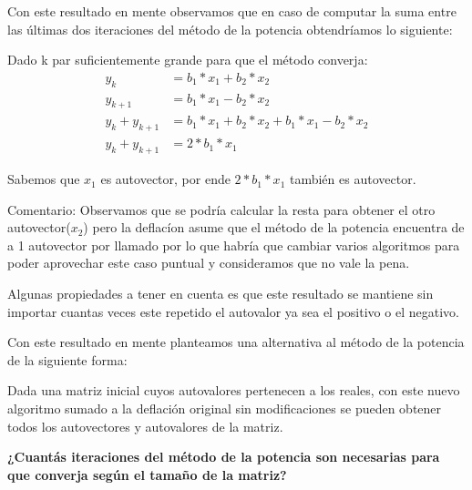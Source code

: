 Con este resultado en mente observamos que en caso de computar la suma entre las últimas dos iteraciones del método de la potencia obtendríamos lo siguiente:

\vspace{1em}
Dado k par suficientemente grande para que el método converja: 
\begin{align}
    y_k &= b_1 * x_1 + b_2 * x_2 \\ 
    y_{k+1} &= b_1 * x_1 - b_2 * x_2 \\ 
    y_k + y_{k+1} &= b_1 * x_1 + b_2 * x_2 + b_1 * x_1 - b_2 * x_2 \\ 
    y_k + y_{k+1} &= 2 * b_1 * x_1
\end{align}

Sabemos que $x_1$ es autovector, por ende $2 * b_1 * x_1$ también es autovector.

\vspace{1em}

Comentario: Observamos que se podría calcular la resta para obtener el otro autovector($x_2$) pero la deflacíon asume que el método de la potencia encuentra de a 1 autovector por llamado por lo que habría que cambiar varios algoritmos para poder aprovechar este caso puntual y consideramos que no vale la pena.

\vspace{1em}

Algunas propiedades a tener en cuenta es que este resultado se mantiene sin importar cuantas veces este repetido el autovalor ya sea el positivo o el negativo.

\vspace{1em}
Con este resultado en mente planteamos una alternativa al método de la potencia de la siguiente forma:

\vspace{1em}


\vspace{1em}
Dada una matriz inicial cuyos autovalores pertenecen a los reales, con este nuevo algoritmo sumado a la deflación original sin modificaciones se pueden obtener todos los autovectores y autovalores de la matriz.

\vspace{1em}

\begin{large}  
    \textbf{¿Cuantás iteraciones del método de la potencia son necesarias para que converja según el tamaño de la matriz?}
\end{large}  

